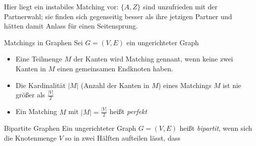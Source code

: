 \documentclass{panikzettel}
\begin{document}
{\begin{halfboxr}
\begin{center}
	
	Hier liegt ein instabiles Matching vor: $\{A,Z\}$ sind unzufrieden mit der Partnerwahl; sie finden sich gegenseitig besser als ihre jetzigen Partner und hätten damit Anlass für einen Seitensprung.
	\end{center}
\end{halfboxr}


\begin{halfboxl}
	\vspace{-\baselineskip}
	\begin{defi}{Matchings in Graphen}
	Sei $G = (V,E)$ ein ungerichteter Graph\\
	
	\begin{itemize}
	\item Eine Teilmenge $M$ der Kanten wird Matching gennant, wenn keine zwei Kanten in $M$ einen gemeinsamen Endknoten haben.
	
	\item Die Kardinalität $|M|$ (Anzahl der Kanten in $M$) eines Matchings $M$ ist nie größer als $\frac{|V|}{2}$
	
	\item Ein Matching $M$ mit $|M| = \frac{|V|}{2}$ heißt \emph{perfekt}
	
	\end{itemize}
	\end{defi}
\end{halfboxl}%
\begin{halfboxr}
	\vspace{-\baselineskip}
	\begin{defi}{Bipartite Graphen}
	Ein ungerichteter Graph $G = (V,E)$ heißt \emph{bipartit}, wenn sich die Knotenmenge $V$ so in zwei Hälften aufteilen lässt, dass\\
	

\end{defi}
\end{halfboxr}}
\end{document}
